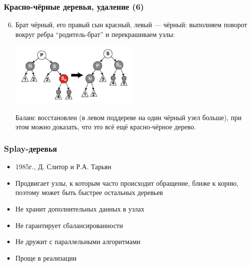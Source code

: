\documentclass[xetex,mathserif,serif]{beamer}
\begin{document}
    \begin{frame}
        \frametitle{Красно-чёрные деревья, удаление (6)}
        \begin{enumerate}
            \setcounter{enumi}{5}
            \item Брат чёрный, его правый сын красный, левый --- чёрный: выполняем поворот вокруг ребра ``родитель-брат'' и перекрашиваем узлы:
            \begin{center}
                \includegraphics[width=0.5\textwidth]{deletion-from-red-black-tree5.png}
            \end{center}
            Баланс восстановлен (в левом поддереве на один чёрный узел больше), при этом можно доказать, что это всё ещё красно-чёрное дерево.
        \end{enumerate}
    \end{frame}

    \begin{frame}
        \frametitle{Splay-деревья}
        \begin{itemize}
            \item 1985г., Д. Слитор и Р.А. Тарьян
            \item Продвигает узлы, к которым часто происходит обращение, ближе к корню, поэтому может быть быстрее остальных деревьев
            \item Не хранит дополнительных данных в узлах
            \item Не гарантирует сбалансированности
            \item Не дружит с параллельными алгоритмами
            \item Проще в реализации
        \end{itemize}
    \end{frame}
\end{document}
